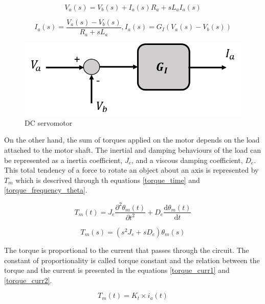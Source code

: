 \begin{equation}\label{DC_servomotor_equation2}
V_{a}(s)= V_{b}(s)+I_{a}(s) R_{a}+sL_{a}I_{a}(s)
\end{equation}

\begin{equation}\label{DC_servomotor_equation3}
I_{a}(s)= \frac{V_{a}(s)-V_{b}(s)}{R_{a}+sL_{a}} , I_{a}(s)= G_{I}(V_{a}(s)-V_{b}(s))
\end{equation}

\begin{figure}[H]
\centering
\includegraphics[scale=0.6]{figures/model1.png}
\caption{DC servomotor}
\label{model1}
\end{figure}

On the other hand, the sum of torques applied on the motor depends on the load attached to the motor shaft. The inertial and damping behaviours of the load can be represented as a inertia coefficient, $J_{e}$, and a viscous damping coefficient, $D_{e}$. This total tendency of a force to rotate an object about an axis is represented by $T_{m}$ which is descrived through th equations \ref{torque_time} and \ref{torque_frequency_theta}.

\begin{equation}\label{torque_time}
T_{m}(t)= J_{e}\frac{\partial^2 \theta_{m}(t)}{\partial t^2}+D_{e}\frac{\mathrm{d} \theta_{m}(t)}{\mathrm{d} t}
\end{equation}

\begin{equation}\label{torque_frequency_theta}
T_{m}(s)= (s^{2}J_{e} + sD_{e})\theta_{m}(s)
\end{equation}

The torque is proportional to the current that passes through the circuit. The constant of proportionality is called torque constant and the relation between the torque and the current is presented in the equations \ref{torque_curr1} and \ref{torque_curr2}. 

\begin{equation}\label{torque_curr1}
T_{m}(t)= K_{t}\times i_{a}(t)
\end{equation}

